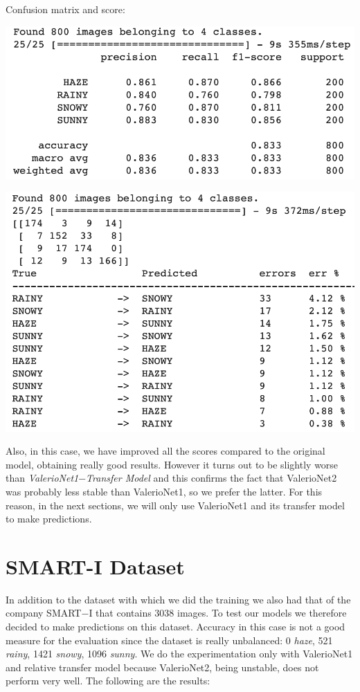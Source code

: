 \documentclass[12pt]{article}
\begin{document}
Confusion matrix and score: \newline
\begin{minipage}[c]{.5\textwidth}
 \centering
 \includegraphics[width=\textwidth]{pic12}
\end{minipage}
\hspace{1em}
\begin{minipage}[c]{.5\textwidth}
 \centering
 \includegraphics[width=\textwidth]{pic13}
\end{minipage}

Also, in this case, we have improved all the scores compared to the original model, obtaining really good results. However it turns out to be slightly worse than {\em ValerioNet1$-$Transfer Model} and this confirms the fact that ValerioNet2 was probably less stable than ValerioNet1, so we prefer the latter. For this reason, in the next sections, we will only use ValerioNet1 and its transfer model to make predictions.

\newpage
\section{SMART-I Dataset}
In addition to the dataset with which we did the training we also had that of the company SMART$-$I that contains 3038 images. To test our models we therefore decided to make predictions on this dataset. Accuracy in this case is not a good measure for the evaluation since the dataset is really unbalanced: 0 {\em haze}, 521 {\em rainy}, 1421 {\em snowy}, 1096 {\em sunny}. We do the experimentation only with ValerioNet1 and relative transfer model because ValerioNet2, being unstable, does not perform very well. The following are the results:
\end{document}
